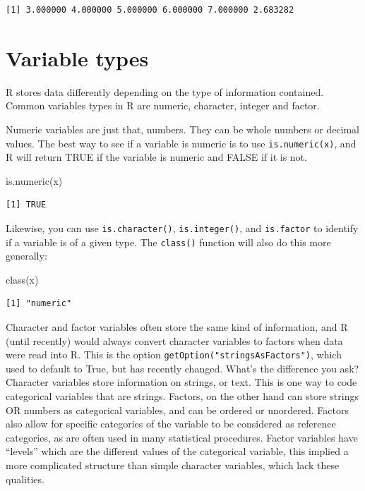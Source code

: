 \documentclass[
  letterpaper,
  DIV=11,
  numbers=noendperiod]{scrreprt}
\newenvironment{Shaded}{\begin{snugshade}}{\end{snugshade}}
\newcommand{\FunctionTok}[1]{\textcolor[rgb]{0.28,0.35,0.67}{#1}}
\newcommand{\NormalTok}[1]{\textcolor[rgb]{0.00,0.23,0.31}{#1}}
\begin{document}
\begin{verbatim}
[1] 3.000000 4.000000 5.000000 6.000000 7.000000 2.683282
\end{verbatim}

\hypertarget{variable-types}{%
\section{Variable types}\label{variable-types}}

R stores data differently depending on the type of information
contained. Common variables types in R are numeric, character, integer
and factor.

Numeric variables are just that, numbers. They can be whole numbers or
decimal values. The best way to see if a variable is numeric is to use
\texttt{is.numeric(x)}, and R will return TRUE if the variable is
numeric and FALSE if it is not.

\begin{Shaded}
\begin{Highlighting}[]
\FunctionTok{is.numeric}\NormalTok{(x)}
\end{Highlighting}
\end{Shaded}

\begin{verbatim}
[1] TRUE
\end{verbatim}

Likewise, you can use \texttt{is.character()}, \texttt{is.integer()},
and \texttt{is.factor} to identify if a variable is of a given type. The
\texttt{class()} function will also do this more generally:

\begin{Shaded}
\begin{Highlighting}[]
\FunctionTok{class}\NormalTok{(x)}
\end{Highlighting}
\end{Shaded}

\begin{verbatim}
[1] "numeric"
\end{verbatim}

Character and factor variables often store the same kind of information,
and R (until recently) would always convert character variables to
factors when data were read into R. This is the option
\texttt{getOption("stringsAsFactors")}, which used to default to True,
but has recently changed. What's the difference you ask? Character
variables store information on strings, or text. This is one way to code
categorical variables that are strings. Factors, on the other hand can
store strings OR numbers as categorical variables, and can be ordered or
unordered. Factors also allow for specific categories of the variable to
be considered as reference categories, as are often used in many
statistical procedures. Factor variables have ``levels'' which are the
different values of the categorical variable, this implied a more
complicated structure than simple character variables, which lack these
qualities.
\end{document}
